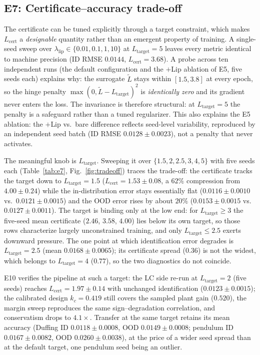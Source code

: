 \documentclass[11pt,sagev,times]{sagej}
\newcommand{\Lhat}{L_{\mathrm{cert}}}
\newcommand{\Ltarget}{L_{\mathrm{target}}}
\begin{document}
\subsection{E7: Certificate--accuracy trade-off}
The certificate can be tuned explicitly through a target constraint, which
makes $\Lhat$ a \emph{designable} quantity rather than an emergent property of
training. A single-seed sweep over
$\lambda_{\mathrm{lip}}\in\{0.01,0.1,1,10\}$ at $\Ltarget=5$ leaves every
metric identical to machine precision (ID RMSE $0.0144$, $\Lhat=3.68$). A probe across ten independent runs (the default configuration and
the $+$Lip ablation of E5, five seeds each) explains why: the surrogate
$\tilde L$ stays within $[1.5,3.8]$ at every epoch, so the hinge penalty
$\max(0,\tilde L-\Ltarget)^2$ is
\emph{identically zero} and its gradient
never enters the loss. The invariance is therefore structural: at
$\Ltarget=5$ the penalty is a safeguard rather than a tuned regularizer.
This also explains the E5
ablation: the $+$Lip vs.\ bare difference reflects seed-level variability,
reproduced by an independent seed batch (ID RMSE $0.0128\pm0.0023$),
not a penalty that never activates.

The meaningful knob is $\Ltarget$. Sweeping it over $\{1.5,2,2.5,3,4,5\}$
with five seeds each (Table~\ref{tab:e7}, Fig.~\ref{fig:tradeoff}) traces the
trade-off: the certificate tracks the target down to $\Ltarget=1.5$
($\Lhat=1.53\pm0.08$, a $62\%$ compression from $4.00\pm0.24$) while the
in-distribution error stays essentially flat ($0.0116\pm0.0010$ vs.\
$0.0121\pm0.0015$) and the OOD error rises by about $20\%$
($0.0153\pm0.0015$ vs.\ $0.0127\pm0.0011$). The target is binding only at
the low end: for $\Ltarget\ge3$ the five-seed mean certificate
($2.46$, $3.58$, $4.00$) lies below its own target, so those rows
characterize largely unconstrained training, and only $\Ltarget\le2.5$
exerts downward pressure. The one point at which identification error
degrades is $\Ltarget=2.5$ (mean $0.0168\pm0.0065$); its certificate spread
($0.36$) is not the widest, which belongs to $\Ltarget=4$ ($0.77$), so the
two diagnostics do not coincide.

E10 verifies the pipeline at such a target: the LC side re-run at
$\Ltarget=2$ (five seeds) reaches $\Lhat=1.97\pm0.14$ with unchanged
identification ($0.0123\pm0.0015$); the calibrated design
$k_c=0.419$ still covers the sampled plant gain
($0.520$), the margin sweep reproduces the same
sign--degradation correlation, and conservatism drops to
$4.1\times$. Transfer at the same target retains its mean accuracy
(Duffing ID $0.0118\pm0.0008$, OOD $0.0149\pm0.0008$; pendulum ID
$0.0167\pm0.0082$, OOD $0.0260\pm0.0038$), at the price of a wider seed
spread than at the default target, one pendulum seed being an outlier.
\end{document}
